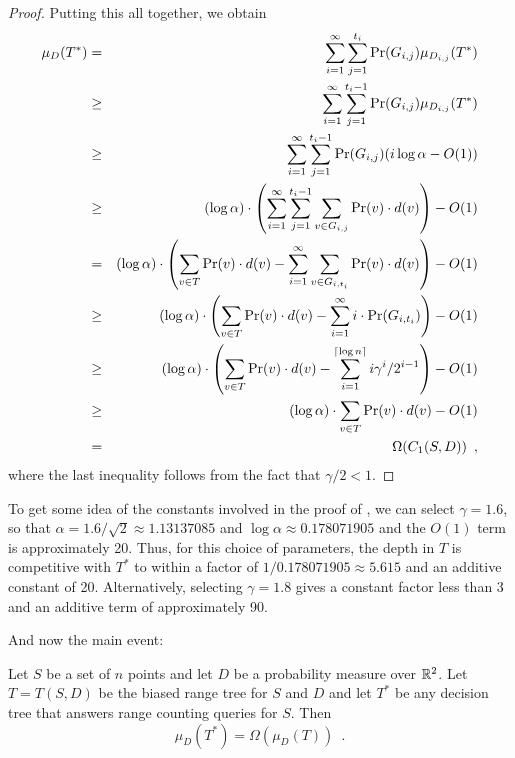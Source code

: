 \documentclass[charterfonts]{patmorin}
\newcommand{\depth}{d}
\begin{document}
\begin{proof}
Putting this all together, we obtain
\begin{eqnarray*}
\mu_D(T^*) 
  & = & \sum_{i=1}^{\infty}\sum_{j=1}^{t_i}\Pr(G_{i,j})\mu_{D_{i,j}}(T^*) \\
  & \ge & \sum_{i=1}^{\infty}
    \sum_{j=1}^{t_i-1}\Pr(G_{i,j})\mu_{D_{i,j}}(T^*) \\
  & \ge & \sum_{i=1}^{\infty}\sum_{j=1}^{t_i-1}
           \Pr(G_{i,j})( i\log\alpha -O(1)) \\
  & \ge & (\log\alpha)\cdot
       \left(
         \sum_{i=1}^{\infty}\sum_{j=1}^{t_i-1}
		\sum_{v\in G_{i,j}}\Pr(v)\cdot\depth(v) 
       \right) - O(1)
         \\
  & = & (\log\alpha)\cdot
       \left(\sum_{v\in T}\Pr(v)\cdot \depth(v)
          -    \sum_{i=1}^{\infty}
		\sum_{v\in G_{i,t_i}}\Pr(v)\cdot\depth(v)
       \right) - O(1)\\
  & \ge & (\log\alpha)\cdot
       \left(\sum_{v\in T}\Pr(v)\cdot \depth(v)
          -    \sum_{i=1}^{\infty}i\cdot\Pr(G_{i,t_i})
       \right) - O(1) \\
  & \ge & (\log\alpha)\cdot
       \left(\sum_{v\in T}\Pr(v)\cdot \depth(v)
          -    \sum_{i=1}^{\ceil{\log n}}i\gamma^i/2^{i-1}
       \right) - O(1) \\
  & \ge &  (\log\alpha)\cdot\sum_{v\in T}\Pr(v)\cdot \depth(v) - O(1) \\
  & = & \Omega(C_1(S,D)) \enspace ,
\end{eqnarray*}
where the last inequality follows from the fact that $\gamma/2 < 1$. 
\end{proof}

To get some idea of the constants involved in the proof of
, we can select $\gamma=1.6$, so that
$\alpha=1.6/\sqrt{2}\approx 1.13137085$ and $\log \alpha \approx
0.178071905$ and the $O(1)$ term is approximately 20.  Thus, for this
choice of parameters, the depth in $T$ is competitive with $T^*$ to
within a factor of $1/0.178071905\approx 5.615$ and an additive
constant of 20.  Alternatively, selecting $\gamma=1.8$ gives a
constant factor less than 3 and an additive term of approximately 90.

And now the main event:

\begin{thm}
Let $S$ be a set of $n$ points and let $D$ be a probability measure
over $\mathbb{R}^2$.
Let $T=T(S,D)$ be the biased range tree for $S$ and $D$ and 
let $T^*$ be any decision
tree that answers range counting queries for $S$.  Then
\[
  \mu_D(T^*) = \Omega(\mu_D(T)) \enspace .
\]
\end{thm}
\end{document}
